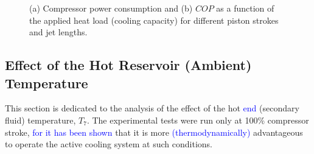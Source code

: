 \documentclass[review,preprint,12pt]{elsarticle}
\begin{document}
\begin{figure}[!htp]
\centering
{}
\hfil
{}
\caption{(a) Compressor power consumption and (b) $COP$ as a function of the applied heat load (cooling capacity) for different piston strokes and jet lengths.}
\label{fig:Figure_11}
\end{figure}

\subsection{Effect of the Hot Reservoir (Ambient) Temperature}


This section is dedicated to the analysis of the effect of the hot \textcolor{blue}{end} (secondary fluid) temperature, $T_{7}$. The experimental tests were run only at 100\% compressor stroke, \textcolor{blue}{for it has been shown \cite{OliveiraBarbosaJr.2016,Oliveira2016}} that it is more \textcolor{blue}{(thermodynamically)} advantageous to operate the active cooling system at such conditions.
\end{document}
